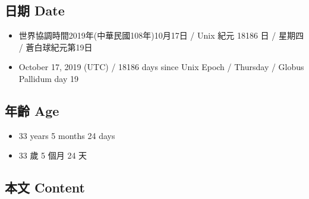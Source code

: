 \documentclass[
]{article}
\providecommand{\tightlist}{%
  \setlength{\itemsep}{0pt}\setlength{\parskip}{0pt}}
\begin{document}
\hypertarget{ux65e5ux671f-date-16}{%
\subsection{日期 Date}\label{ux65e5ux671f-date-16}}

\begin{itemize}
\tightlist
\item
  世界協調時間2019年(中華民國108年)10月17日 / Unix 紀元 18186 日 /
  星期四 / 蒼白球紀元第19日
\item
  October 17, 2019 (UTC) / 18186 days since Unix Epoch / Thursday /
  Globus Pallidum day 19
\end{itemize}

\hypertarget{ux5e74ux9f61-age-16}{%
\subsection{年齡 Age}\label{ux5e74ux9f61-age-16}}

\begin{itemize}
\tightlist
\item
  33 years 5 months 24 days
\item
  33 歲 5 個月 24 天
\end{itemize}

\hypertarget{ux672cux6587-content-16}{%
\subsection{本文 Content}\label{ux672cux6587-content-16}}
\end{document}
